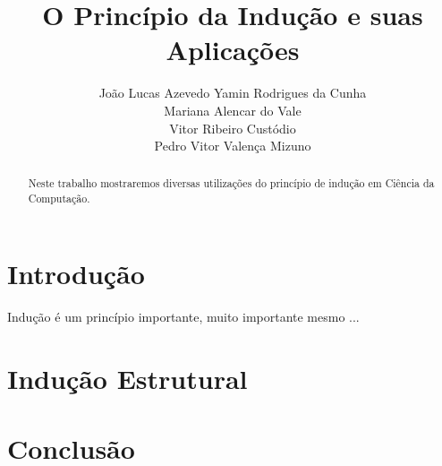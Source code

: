 \documentclass[a4paper, 10pt]{article}
\title{\LARGE \bf
O Princípio da Indução e suas Aplicações
}
\author{João Lucas Azevedo Yamin Rodrigues da Cunha \\
		Mariana Alencar do Vale \\
        Vitor Ribeiro Custódio \\
        Pedro Vitor Valença Mizuno}
\begin{document}
\maketitle

\begin{abstract}

Neste trabalho mostraremos diversas utilizações do princípio de indução em Ciência da Computação.

\end{abstract}

\section{Introdução}

Indução é um princípio importante, muito importante mesmo ...

\section{Indução Estrutural}

\section{Conclusão}
\end{document}
